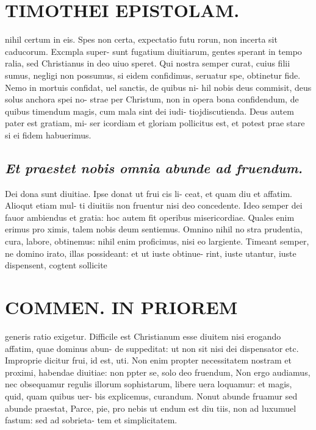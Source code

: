 \documentclass{article}
\begin{document}
\begin{pages}
\section*{TIMOTHEI EPISTOLAM. }
\marginpar{[ p.181 ]}\pstart nihil certum in eis. Spes non certa, expectatio futu rorun, non incerta sit caducorum. Excmpla super- sunt fugatium diuitiarum, gentes sperant in tempo ralia, sed Christianus in deo uiuo speret. Qui nostra semper curat, cuius filii sumus, negligi non possumus, si eidem confidimus, seruatur spe, obtinetur fide. Nemo in mortuis confidat, uel sanctis, de quibus ni- hil nobis deus commisit, deus solus anchora spei no- strae per Christum, non in opera bona confidendum, de quibus timendum magis, cum mala sint dei iudi- tiojdiscutienda. Deus autem pater est gratiam, mi- ser icordiam et gloriam pollicitus est, et potest prae stare si ei fidem habuerimus.  \pend
{}
{}
\subsection*{\textit{Et praestet nobis omnia abunde ad fruendum. }}\pstart Dei dona sunt diuitiae. Ipse donat ut frui cis li- ceat, et quam diu et affatim. Alioqut etiam mul- ti diuitiis non fruentur nisi deo concedente. Ideo semper dei fauor ambiendus et gratia: hoc autem fit operibus misericordiae. Quales enim erimus pro ximis, talem nobis deum sentiemus. Omnino nihil no stra prudentia, cura, labore, obtinemus: nihil enim proficimus, nisi eo largiente. Timeant semper, ne domino irato, illas possideant: et ut iuste obtinue- rint, iuste utantur, iuste dispensent, cogtent sollicite  \pend
\section*{COMMEN. IN PRIOREM }
\marginpar{[ p.182 ]}\pstart generis ratio exigetur. Difficile est Christianum esse diuitem nisi erogando affatim, quae dominus abun- de suppeditat: ut non sit nisi dei dispensator etc.  \pend\pstart Improprie dicitur frui, id est, uti. Non enim propter necessitatem nostram et proximi, habendae diuitiae: non ppter se, solo deo fruendum, Non ergo audiamus, nec obsequamur regulis illorum sophistarum, libere uera loquamur: et magis, quid, quam quibus uer- bis explicemus, curandum. Nonut abunde fruamur sed abunde praestat, Parce, pie, pro nebis ut endum est diu tiis, non ad luxumuel fastum: sed ad sobrieta- tem et simplicitatem.  \pend
{}
{}

\end{pages}
\end{document}
